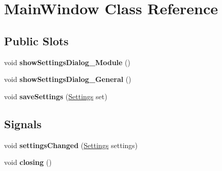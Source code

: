 \hypertarget{classMainWindow}{
\section{MainWindow Class Reference}
\label{classMainWindow}
}
\subsection*{Public Slots}
\begin{DoxyCompactItemize}
\item 
\hypertarget{classMainWindow_ac4d16cb0945152f7be27dcac8f85703d}{
void {\bfseries showSettingsDialog\_\-Module} ()}
\label{classMainWindow_ac4d16cb0945152f7be27dcac8f85703d}

\item 
\hypertarget{classMainWindow_a1c14a341d9d6b8c3b76d7c4a838463d8}{
void {\bfseries showSettingsDialog\_\-General} ()}
\label{classMainWindow_a1c14a341d9d6b8c3b76d7c4a838463d8}

\item 
\hypertarget{classMainWindow_adcb5fb16f13d14efcf2d8c37cb44d732}{
void {\bfseries saveSettings} (\hyperlink{classSettings}{Settings} set)}
\label{classMainWindow_adcb5fb16f13d14efcf2d8c37cb44d732}

\end{DoxyCompactItemize}
\subsection*{Signals}
\begin{DoxyCompactItemize}
\item 
\hypertarget{classMainWindow_aa5579ecfd0f160021551ba302e122149}{
void {\bfseries settingsChanged} (\hyperlink{classSettings}{Settings} settings)}
\label{classMainWindow_aa5579ecfd0f160021551ba302e122149}

\item 
\hypertarget{classMainWindow_ac03d41a0c3906055917074addf64403b}{
void {\bfseries closing} ()}
\label{classMainWindow_ac03d41a0c3906055917074addf64403b}

\end{DoxyCompactItemize}
